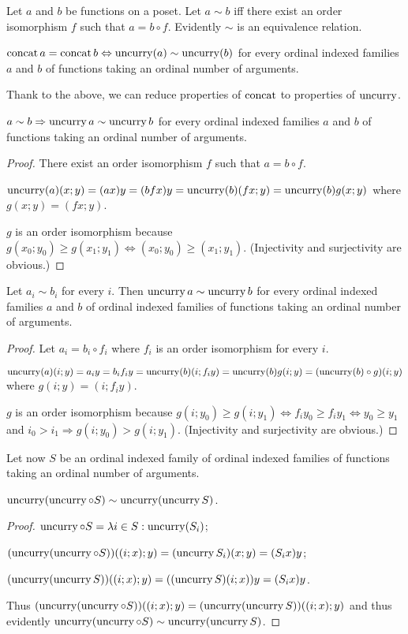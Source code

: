 Let $a$ and $b$ be functions on a poset. Let $a\sim b$ iff there
exist an order isomorphism $f$ such that $a=b\circ f$. Evidently
$\sim$ is an equivalence relation.
\begin{obvious}
$\operatorname{concat} a=\operatorname{concat} b\Leftrightarrow\operatorname{uncurry}(a)\sim\operatorname{uncurry}(b)$ for
every ordinal indexed families $a$ and $b$ of functions taking an
ordinal number of arguments.
\end{obvious}
Thank to the above, we can reduce properties of $\operatorname{concat}$ to properties
of $\operatorname{uncurry}$.
\begin{lem}
$a\sim b\Rightarrow\operatorname{uncurry} a\sim\operatorname{uncurry} b$ for every ordinal indexed
families $a$ and $b$ of functions taking an ordinal number of arguments.\end{lem}
\begin{proof}
There exist an order isomorphism $f$ such that $a=b\circ f$.

$\operatorname{uncurry}(a)(x;y)=(ax)y=(bfx)y=\operatorname{uncurry}(b)(fx;y)=\operatorname{uncurry}(b)g(x;y)$
where $g(x;y)=(fx;y)$.

$g$ is an order isomorphism because $g(x_{0};y_{0})\ge g(x_{1};y_{1})\Leftrightarrow(x_{0};y_{0})\ge(x_{1};y_{1})$.
(Injectivity and surjectivity are obvious.)\end{proof}
\begin{lem}
\label{by-member}Let $a_{i}\sim b_{i}$ for every $i$. Then $\operatorname{uncurry} a\sim\operatorname{uncurry} b$
for every ordinal indexed families $a$ and $b$ of ordinal indexed
families of functions taking an ordinal number of arguments.\end{lem}
\begin{proof}
Let $a_{i}=b_{i}\circ f_{i}$ where $f_{i}$ is an order isomorphism
for every $i$.

$\operatorname{uncurry}(a)(i;y)=a_{i}y=b_{i}f_{i}y=\operatorname{uncurry}(b)(i;f_{i}y)=\operatorname{uncurry}(b)g(i;y)=(\operatorname{uncurry}(b)\circ g)(i;y)$
where $g(i;y)=(i;f_{i}y)$.

$g$ is an order isomorphism because $g(i;y_{0})\ge g(i;y_{1})\Leftrightarrow f_{i}y_{0}\ge f_{i}y_{1}\Leftrightarrow y_{0}\ge y_{1}$
and $i_{0}>i_{1}\Rightarrow g(i;y_{0})>g(i;y_{1})$. (Injectivity
and surjectivity are obvious.)
\end{proof}
Let now $S$ be an ordinal indexed family of ordinal indexed families
of functions taking an ordinal number of arguments.
\begin{lem}
$\operatorname{uncurry}(\operatorname{uncurry}\circ S)\sim\operatorname{uncurry}(\operatorname{uncurry} S)$.\end{lem}
\begin{proof}
$\operatorname{uncurry}\circ S=\lambda i\in S:\operatorname{uncurry}(S_{i})$;

$(\operatorname{uncurry}(\operatorname{uncurry}\circ S))((i;x);y)=(\operatorname{uncurry} S_{i})(x;y)=(S_{i}x)y$;

$(\operatorname{uncurry}(\operatorname{uncurry} S))((i;x);y)=((\operatorname{uncurry} S)(i;x))y=(S_{i}x)y$.

Thus $(\operatorname{uncurry}(\operatorname{uncurry}\circ S))((i;x);y)=(\operatorname{uncurry}(\operatorname{uncurry} S))((i;x);y)$
and thus evidently $\operatorname{uncurry}(\operatorname{uncurry}\circ S)\sim\operatorname{uncurry}(\operatorname{uncurry} S)$.\end{proof}
